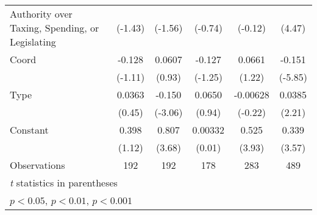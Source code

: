 {\begin{tabular}{l*{5}{c}}
Authority over Taxing, Spending, or Legislating&  (-1.43)         &  (-1.56)         &  (-0.74)         &  (-0.12)         &   (4.47)         \\
\addlinespace
Coord           &   -0.128         &   0.0607         &   -0.127         &   0.0661         &   -0.151\sym{***}\\
                &  (-1.11)         &   (0.93)         &  (-1.25)         &   (1.22)         &  (-5.85)         \\
\addlinespace
Type            &   0.0363         &   -0.150\sym{**} &   0.0650         & -0.00628         &   0.0385\sym{*}  \\
                &   (0.45)         &  (-3.06)         &   (0.94)         &  (-0.22)         &   (2.21)         \\
\addlinespace
Constant        &    0.398         &    0.807\sym{***}&  0.00332         &    0.525\sym{***}&    0.339\sym{***}\\
                &   (1.12)         &   (3.68)         &   (0.01)         &   (3.93)         &   (3.57)         \\
\midrule
Observations    &      192         &      192         &      178         &      283         &      489         \\
\bottomrule
\multicolumn{6}{l}{\footnotesize \textit{t} statistics in parentheses}\\
\multicolumn{6}{l}{\footnotesize \sym{*} \(p<0.05\), \sym{**} \(p<0.01\), \sym{***} \(p<0.001\)}\\
\end{tabular}
}
